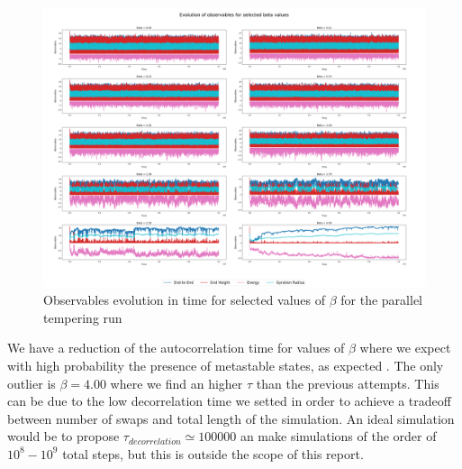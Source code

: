 \begin{figure}[H]
    \centering
    \includegraphics[width=\textwidth]{FIG/exercise_6_images/observables_mmc_polymer_summary.png}
    \caption{Observables evolution in time for selected values of $\beta$ for the parallel tempering run}
    \label{lec6:polymer_evolution_mmc}
\end{figure}

We have a reduction of the autocorrelation time for values of $\beta$ where we expect with high probability the presence of metastable states, as expected \cite{OrlandoBrando}. The only outlier is $\beta = 4.00$ where we 
find an higher $\tau$ than the previous attempts. This can be due to the low decorrelation time we setted in order to achieve a tradeoff between number of swaps and total length of the simulation.
An ideal simulation would be to propose $\tau_{decorrelation} \simeq 100000$ an make simulations of the order of $10^8-10^9$ total steps, but this is outside the scope of this report.